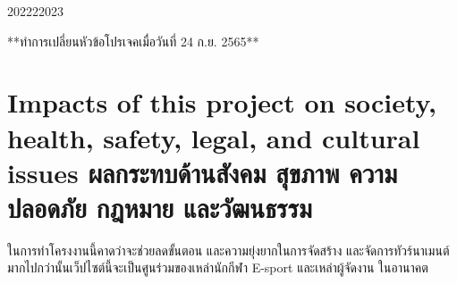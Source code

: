 \begin{plan}{9}{2022}{2}{2023}
\end{plan}
\begin{center}
**ทำการเปลี่ยนหัวข้อโปรเจคเมื่อวันที่ 24 ก.ย. 2565**
\end{center}

\section{\ifenglish%
Impacts of this project on society, health, safety, legal, and cultural issues
\else%
ผลกระทบด้านสังคม สุขภาพ ความปลอดภัย กฎหมาย และวัฒนธรรม
\fi}

ในการทำโครงงานนี้คาดว่าจะช่วยลดขั้นตอน และความยุ่งยากในการจัดสร้าง และจัดการทัวร์นาเมนต์
มากไปกว่านั้นเว็ปไซต์นี้จะเป็นศูนร่วมของเหล่านักกีฬา E-sport และเหล่าผู้จัดงาน ในอานาคต
